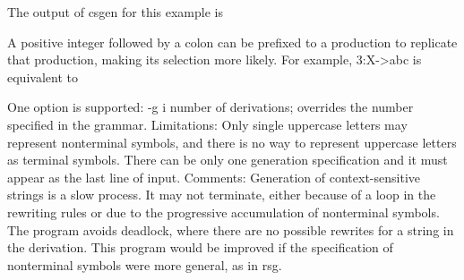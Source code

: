 
The output of \textsf{csgen} for this example is


A positive integer followed by a colon can be prefixed to a production
to replicate that production, making its selection more likely. For
example, \textsf{3:X-{\textgreater}abc} is equivalent to




One option is supported: \textsf{{}-g i} number of derivations;
overrides the number specified in the grammar. Limitations: Only single
uppercase letters may represent nonterminal symbols, and there is no
way to represent uppercase letters as terminal symbols. There can be
only one generation specification and it must appear as the last line
of input. Comments: Generation of context-sensitive strings is a slow
process. It may not terminate, either because of a loop in the
rewriting rules or due to the progressive accumulation of nonterminal
symbols. The program avoids deadlock, where there are no possible
rewrites for a string in the derivation. This program would be improved
if the specification of nonterminal symbols were more general, as in
\textsf{rsg}.

